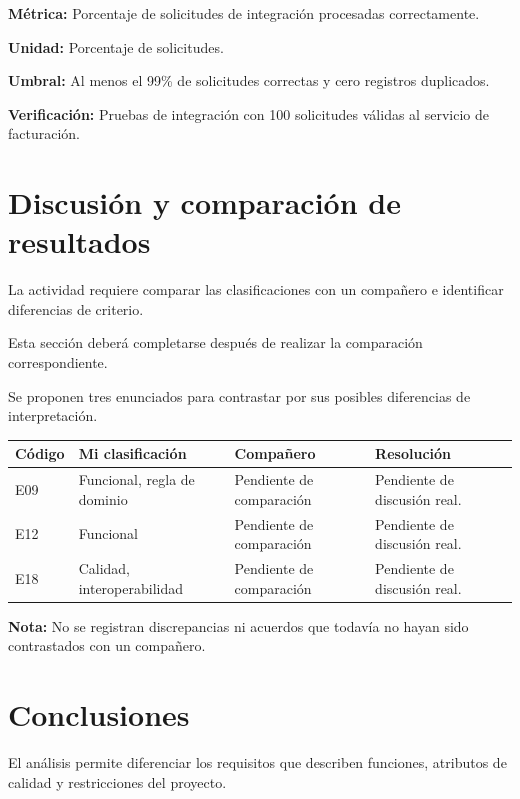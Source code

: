 \documentclass[12pt,a4paper]{article}
\begin{document}
\textbf{Métrica:}
Porcentaje de solicitudes de integración
procesadas correctamente.

\textbf{Unidad:}
Porcentaje de solicitudes.

\textbf{Umbral:}
Al menos el 99\% de solicitudes
correctas y cero registros duplicados.

\textbf{Verificación:}
Pruebas de integración con
100 solicitudes válidas al
servicio de facturación.

\section{Discusión y comparación de resultados}

La actividad requiere comparar las
clasificaciones con un compañero
e identificar diferencias de criterio.

Esta sección deberá completarse
después de realizar la comparación
correspondiente.

Se proponen tres enunciados para
contrastar por sus posibles
diferencias de interpretación.

\begin{longtable}{
P{1.5cm}
P{4.2cm}
P{4.2cm}
P{5.3cm}
}

\toprule

\textbf{Código} &
\textbf{Mi clasificación} &
\textbf{Compañero} &
\textbf{Resolución}\\

\midrule
\endhead

E09 &
Funcional, regla de dominio &
Pendiente de comparación &
Pendiente de discusión real.\\

E12 &
Funcional &
Pendiente de comparación &
Pendiente de discusión real.\\

E18 &
Calidad, interoperabilidad &
Pendiente de comparación &
Pendiente de discusión real.\\

\bottomrule

\end{longtable}

\textbf{Nota:}
No se registran discrepancias ni acuerdos
que todavía no hayan sido contrastados
con un compañero.

\section{Conclusiones}

El análisis permite diferenciar los
requisitos que describen funciones,
atributos de calidad y restricciones
del proyecto.
\end{document}
